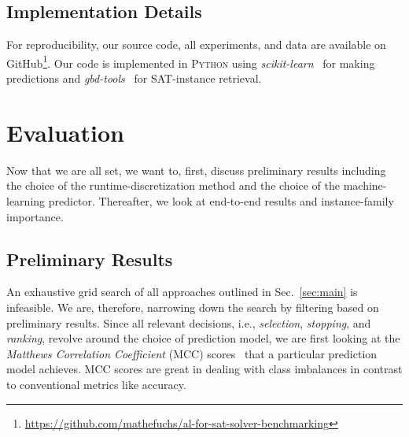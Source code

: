\documentclass[runningheads]{llncs}
\begin{document}

\subsection{Implementation Details}
For reproducibility, our source code, all experiments, and data are available on GitHub\footnote{\url{https://github.com/mathefuchs/al-for-sat-solver-benchmarking}}.
Our code is implemented in \textsc{Python} using \emph{scikit-learn}~\cite{scikit-learn} for making predictions and \emph{gbd-tools}~\cite{IserS18} for SAT-instance retrieval.


\section{Evaluation}
\label{sec:eval}
Now that we are all set, we want to, first, discuss preliminary results including the choice of the runtime-discretization method and the choice of the machine-learning predictor.
Thereafter, we look at end-to-end results and instance-family importance.

\subsection{Preliminary Results}
\label{sec:evalprel}
An exhaustive grid search of all approaches outlined in Sec.~\ref{sec:main} is infeasible.
We are, therefore, narrowing down the search by filtering based on preliminary results.
Since all relevant decisions, i.e., \emph{selection}, \emph{stopping}, and \emph{ranking}, revolve around the choice of prediction model, we are first looking at the \emph{Matthews Correlation Coefficient} (MCC) scores~\cite{gorodkin2004comparing,matthews1975comparison} that a particular prediction model achieves.
MCC scores are great in dealing with class imbalances in contrast to conventional metrics like accuracy.
\end{document}
